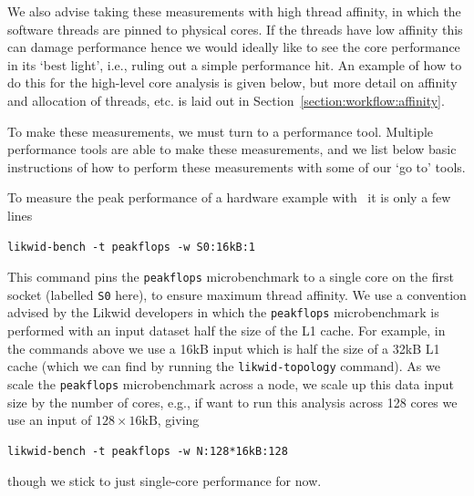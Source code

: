 We also advise taking these measurements with high thread affinity, in which the software threads are pinned to physical cores. If the threads have low affinity this can damage performance hence we would ideally like to see the core performance in its `best light', i.e., ruling out a simple performance hit. An example of how to do this for the high-level core analysis is given below, but more detail on affinity and allocation of threads, etc. is laid out in Section~\ref{section:workflow:affinity}.

To make these measurements, we must turn to a performance tool. Multiple performance tools are able to make these measurements, and we list below basic instructions of how to perform these measurements with some of our `go to' tools.

\begin{instructions}{\likwid}
To measure the peak performance of a hardware example with \likwid\, it is only a few lines

\begin{verbatim}
likwid-bench -t peakflops -w S0:16kB:1
\end{verbatim}
   
\noindent

This command pins the \texttt{peakflops} microbenchmark to a single core on the first socket (labelled \texttt{S0} here), to ensure maximum thread affinity. We use a convention advised by the Likwid developers in which the \texttt{peakflops} microbenchmark is performed with an input dataset half the size of the L1 cache. For example, in the commands above we use a 16kB input which is half the size of a 32kB L1 cache (which we can find by running the \texttt{likwid-topology} command). As we scale the \texttt{peakflops} microbenchmark across a node, we scale up this data input size by the number of cores, e.g., if want to run this analysis across 128 cores we use an input of $128\times16\text{kB}$, giving
\begin{verbatim}
likwid-bench -t peakflops -w N:128*16kB:128
\end{verbatim}
though we stick to just single-core performance for now.
 

\end{instructions}

